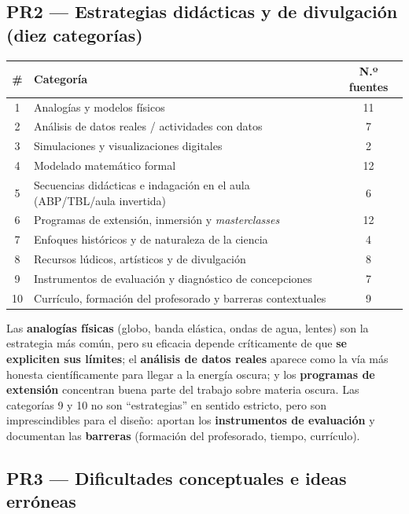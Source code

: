 \subsection{PR2 --- Estrategias didácticas y de divulgación (diez categorías)}\label{sec:pr2}

\begin{table}[ht]
\centering
\begin{tabular}{|c|l|c|} \hline
\rowcolor{naranja}
{\color{white}\textbf{\#}} & {\color{white}\textbf{Categoría}} & {\color{white}\textbf{N.º fuentes}} \\ \hline
1 & Analogías y modelos físicos & 11 \\ \hline
2 & Análisis de datos reales / actividades con datos & 7 \\ \hline
3 & Simulaciones y visualizaciones digitales & 2 \\ \hline
4 & Modelado matemático formal & 12 \\ \hline
5 & Secuencias didácticas e indagación en el aula (ABP/TBL/aula invertida) & 6 \\ \hline
6 & Programas de extensión, inmersión y \textit{masterclasses} & 12 \\ \hline
7 & Enfoques históricos y de naturaleza de la ciencia & 4 \\ \hline
8 & Recursos lúdicos, artísticos y de divulgación & 8 \\ \hline
9 & Instrumentos de evaluación y diagnóstico de concepciones & 7 \\ \hline
10 & Currículo, formación del profesorado y barreras contextuales & 9 \\ \hline
\end{tabular}
\end{table}

Las \textbf{analogías físicas} (globo, banda elástica, ondas de agua, lentes) son la estrategia más común, pero su eficacia depende críticamente de que \textbf{se expliciten sus límites}; el \textbf{análisis de datos reales} aparece como la vía más honesta científicamente para llegar a la energía oscura; y los \textbf{programas de extensión} concentran buena parte del trabajo sobre materia oscura. Las categorías 9 y 10 no son ``estrategias'' en sentido estricto, pero son imprescindibles para el diseño: aportan los \textbf{instrumentos de evaluación} y documentan las \textbf{barreras} (formación del profesorado, tiempo, currículo).

\subsection{PR3 --- Dificultades conceptuales e ideas erróneas}\label{sec:pr3}

